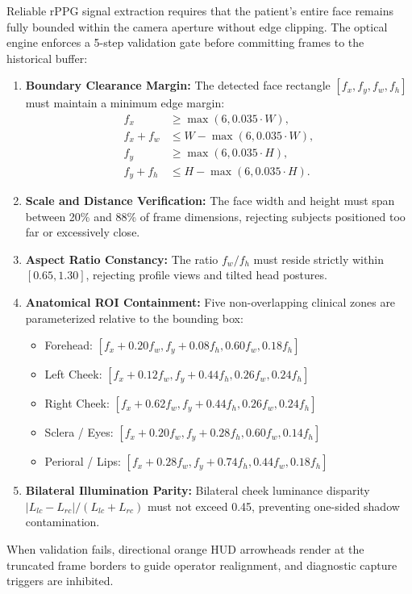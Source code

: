 \documentclass[journal]{IEEEtran}
\begin{document}
Reliable rPPG signal extraction requires that the patient's entire face remains fully bounded within the camera aperture without edge clipping. The optical engine enforces a 5-step validation gate before committing frames to the historical buffer:
\begin{enumerate}
    \item \textbf{Boundary Clearance Margin:} The detected face rectangle $[f_x, f_y, f_w, f_h]$ must maintain a minimum edge margin:
    \begin{align}
        f_x &\ge \max(6, 0.035 \cdot W), \\
        f_x + f_w &\le W - \max(6, 0.035 \cdot W), \\
        f_y &\ge \max(6, 0.035 \cdot H), \\
        f_y + f_h &\le H - \max(6, 0.035 \cdot H).
    \end{align}
    \item \textbf{Scale and Distance Verification:} The face width and height must span between 20\% and 88\% of frame dimensions, rejecting subjects positioned too far or excessively close.
    \item \textbf{Aspect Ratio Constancy:} The ratio $f_w / f_h$ must reside strictly within $[0.65, 1.30]$, rejecting profile views and tilted head postures.
    \item \textbf{Anatomical ROI Containment:} Five non-overlapping clinical zones are parameterized relative to the bounding box:
    \begin{itemize}
        \item Forehead: $[f_x + 0.20 f_w, f_y + 0.08 f_h, 0.60 f_w, 0.18 f_h]$
        \item Left Cheek: $[f_x + 0.12 f_w, f_y + 0.44 f_h, 0.26 f_w, 0.24 f_h]$
        \item Right Cheek: $[f_x + 0.62 f_w, f_y + 0.44 f_h, 0.26 f_w, 0.24 f_h]$
        \item Sclera / Eyes: $[f_x + 0.20 f_w, f_y + 0.28 f_h, 0.60 f_w, 0.14 f_h]$
        \item Perioral / Lips: $[f_x + 0.28 f_w, f_y + 0.74 f_h, 0.44 f_w, 0.18 f_h]$
    \end{itemize}
    \item \textbf{Bilateral Illumination Parity:} Bilateral cheek luminance disparity $|L_{lc} - L_{rc}| / (L_{lc} + L_{rc})$ must not exceed 0.45, preventing one-sided shadow contamination.
\end{enumerate}

When validation fails, directional orange HUD arrowheads render at the truncated frame borders to guide operator realignment, and diagnostic capture triggers are inhibited.
\end{document}

